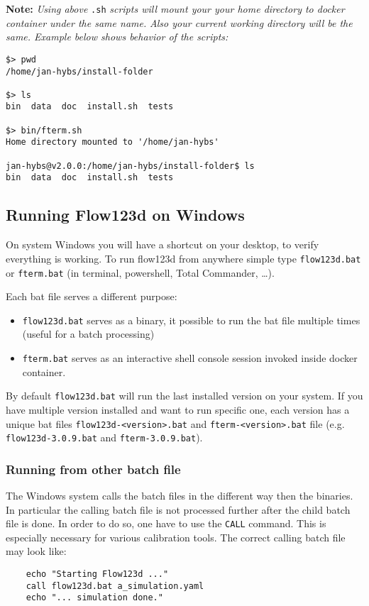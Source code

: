\textbf{Note:}
\textit{Using above} \verb'.sh' \textit{scripts will mount your your home directory to docker container under the same name.}
\textit{Also your current working directory will be the same. Example below shows behavior of the scripts:}
\begin{verbatim}
$> pwd
/home/jan-hybs/install-folder

$> ls
bin  data  doc	install.sh  tests

$> bin/fterm.sh
Home directory mounted to '/home/jan-hybs'

jan-hybs@v2.0.0:/home/jan-hybs/install-folder$ ls
bin  data  doc	install.sh  tests
\end{verbatim}


\subsection{Running Flow123d on Windows}
On system Windows you will have a shortcut on your desktop, to verify everything is working. To run flow123d from anywhere simple type
\verb'flow123d.bat' or \verb'fterm.bat' (in terminal, powershell, Total Commander, \dots).

Each bat file serves a different purpose:
\begin{itemize}
  \item \verb'flow123d.bat' serves as a binary, it possible to run the bat file multiple times (useful for a batch processing)
  \item \verb'fterm.bat' serves as an interactive shell console session invoked inside docker container.
\end{itemize}

By default \verb'flow123d.bat' will run the last installed version on your system. If you have multiple version installed and want to run specific one, each version has a unique bat files \verb'flow123d-<version>.bat' and \verb'fterm-<version>.bat' file (e.g. \verb'flow123d-3.0.9.bat' and \verb'fterm-3.0.9.bat').


\subsubsection{Running from other batch file}
The Windows system calls the batch files in the different way then the binaries. In particular the calling batch file is not processed further after the child batch
file is done. In order to do so, one have to use the \verb'CALL' command. This is especially necessary for various calibration tools. The correct calling batch file
may look like:
\begin{verbatim}
    echo "Starting Flow123d ..."
    call flow123d.bat a_simulation.yaml
    echo "... simulation done."
\end{verbatim}


